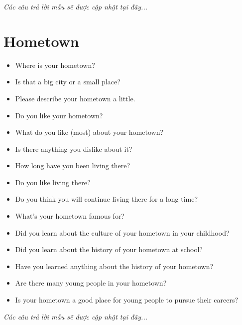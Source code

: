 \vspace{1em}
\textit{Các câu trả lời mẫu sẽ được cập nhật tại đây...}
\vspace{2em}

\section{Hometown}
\begin{ieltsprompt}
\begin{itemize}[itemsep=4pt]
    \item Where is your hometown?
    \item Is that a big city or a small place?
    \item Please describe your hometown a little.
    \item Do you like your hometown?
    \item What do you like (most) about your hometown?
    \item Is there anything you dislike about it?
    \item How long have you been living there?
    \item Do you like living there?
    \item Do you think you will continue living there for a long time?
    \item What's your hometown famous for?
    \item Did you learn about the culture of your hometown in your childhood?
    \item Did you learn about the history of your hometown at school?
    \item Have you learned anything about the history of your hometown?
    \item Are there many young people in your hometown?
    \item Is your hometown a good place for young people to pursue their careers?
\end{itemize}
\end{ieltsprompt}

\vspace{1em}
\textit{Các câu trả lời mẫu sẽ được cập nhật tại đây...}
\vspace{2em}

